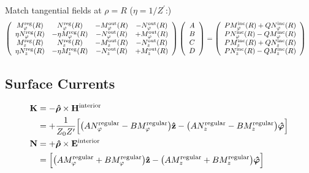 \documentclass[letterpaper]{article}
\newcommand{\vbhatt}[1]{\boldsymbol{\hat #1}}
\begin{document}
\noindent Match tangential fields at $\rho=R$ ($\eta=1/Z^\prime$:)
\renewcommand{\arraystretch}{1.5}
\begin{align*}
 \left(\begin{array}{cccc}
      M^{\hbox{\scriptsize{reg}}}_\varphi(R) 
  &   N^{\hbox{\scriptsize{reg}}}_\varphi(R)
  & - M^{\hbox{\scriptsize{out}}}_\varphi(R) 
  & - N^{\hbox{\scriptsize{out}}}_\varphi(R)
\\
     \eta N^{\hbox{\scriptsize{reg}}}_\varphi(R) 
  & -\eta M^{\hbox{\scriptsize{reg}}}_\varphi(R)
  & -     N^{\hbox{\scriptsize{out}}}_\varphi(R) 
  & +     M^{\hbox{\scriptsize{out}}}_\varphi(R)
\\
      M^{\hbox{\scriptsize{reg}}}_z(R)
  &   N^{\hbox{\scriptsize{reg}}}_z(R)
  &  -M^{\hbox{\scriptsize{out}}}_z(R)
  & - N^{\hbox{\scriptsize{out}}}_z(R)
\\
     \eta N^{\hbox{\scriptsize{reg}}}_z(R)
  & -\eta M^{\hbox{\scriptsize{reg}}}_z(R)
  & -     N^{\hbox{\scriptsize{out}}}_z(R)
  & +     M^{\hbox{\scriptsize{out}}}_z(R)
 \end{array}\right)
 \left(\begin{array}{c}
 A \\ B \\ C \\ D 
 \end{array}\right)
&=
 \left(\begin{array}{c}
 P M_\varphi^{\hbox{\scriptsize{inc}}}(R) + QN_\varphi^{\hbox{\scriptsize{inc}}}(R) \\
 P N_\varphi^{\hbox{\scriptsize{inc}}}(R) - QM_\varphi^{\hbox{\scriptsize{inc}}}(R) \\
 P M_z^{\hbox{\scriptsize{inc}}}(R) + QN_z^{\hbox{\scriptsize{inc}}}(R) \\
 P N_z^{\hbox{\scriptsize{inc}}}(R) - QM_z^{\hbox{\scriptsize{inc}}}(R) \\
 \end{array}\right)
\end{align*}
\renewcommand{\arraystretch}{1.0}

\subsection{Surface Currents}
\begin{align*}
 \vb K &= -\vbhatt{\rho} \times \vb H\sups{interior} \\
       &=+\frac{1}{Z_0 Z^\prime}
           \Big[ \big(A N\sups{regular}_\varphi - BM\sups{regular}_\varphi\big)\vbhat{z}
                -\big(A N\sups{regular}_z       - BM\sups{regular}_z      \big)\vbhatt{\varphi}
           \Big]
\\
 \vb N &= +\vbhatt{\rho} \times \vb E\sups{interior} \\
       &=  \Big[ \big(A M\sups{regular}_\varphi + BM\sups{regular}_\varphi\big)\vbhat{z}
                -\big(A M\sups{regular}_z       + BM\sups{regular}_z      \big)\vbhatt{\varphi}
           \Big]
\end{align*}
\end{document}
